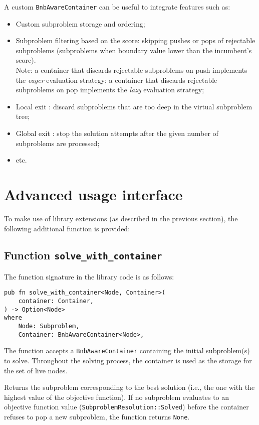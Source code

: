 A custom \texttt{BnbAwareContainer} can be useful to integrate features such as:

\begin{itemize}
 \item Custom subproblem storage and ordering;
 \item Subproblem filtering based on the score: skipping pushes or pops of rejectable
    subproblems (subproblems when boundary value lower than the incumbent's score). \\
    Note: a container that discards rejectable subproblems on push implements the \emph{eager}
    evaluation strategy; a container that discards rejectable subproblems on pop implements
    the \emph{lazy} evaluation strategy;
 \item Local exit \cite{narkawicz2013formalnasa}: discard subproblems that are too deep in
    the virtual subproblem tree;
 \item Global exit \cite{narkawicz2013formalnasa}: stop the solution attempts after the given
    number of subproblems are processed;
 \item etc.
\end{itemize}

\section{Advanced usage interface}

\label{sec:advanced_usage}

To make use of library extensions (as described in the previous section), the following
additional function is provided:

\subsection{Function \texttt{solve\_with\_container}}

The function signature in the library code is as follows:

\begin{lstlisting}[caption=Function \texttt{solve\_with\_container}]
pub fn solve_with_container<Node, Container>(
    container: Container,
) -> Option<Node>
where
    Node: Subproblem,
    Container: BnbAwareContainer<Node>,
\end{lstlisting}

The function accepts a \texttt{BnbAwareContainer} containing the initial subproblem(s) to
solve. Throughout the solving process, the container is used as the storage for the set of
live nodes.

Returns the subproblem corresponding to the best solution (i.e., the one with the
highest value of the objective function). If no subproblem evaluates to an objective
function value (\texttt{SubproblemResolution::Solved}) before the container refuses to pop
a new subproblem, the function returns \texttt{None}.

